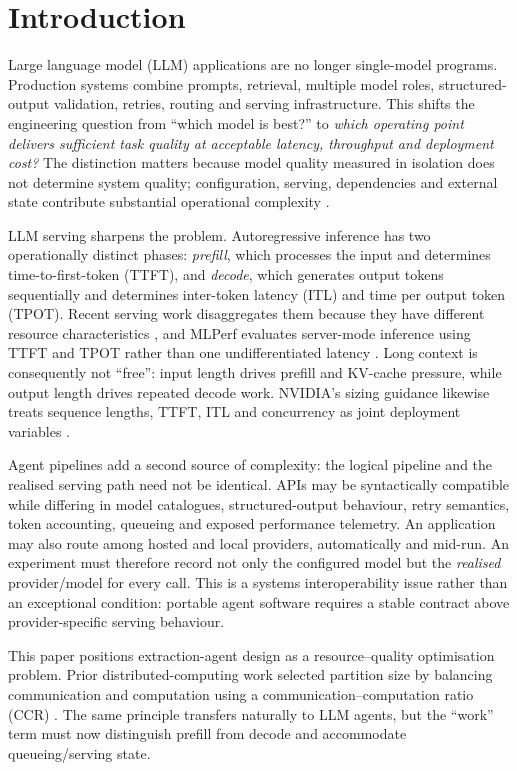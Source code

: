 \documentclass[conference]{IEEEtran}
\begin{document}
\section{Introduction}
Large language model (LLM) applications are no longer single-model programs. Production systems combine prompts, retrieval, multiple model roles, structured-output validation, retries, routing and serving infrastructure. This shifts the engineering question from ``which model is best?'' to \emph{which operating point delivers sufficient task quality at acceptable latency, throughput and deployment cost?} The distinction matters because model quality measured in isolation does not determine system quality; configuration, serving, dependencies and external state contribute substantial operational complexity \cite{sculley2015debt}.

LLM serving sharpens the problem. Autoregressive inference has two operationally distinct phases: \emph{prefill}, which processes the input and determines time-to-first-token (TTFT), and \emph{decode}, which generates output tokens sequentially and determines inter-token latency (ITL) and time per output token (TPOT). Recent serving work disaggregates them because they have different resource characteristics \cite{zhong2024distserve}, and MLPerf evaluates server-mode inference using TTFT and TPOT rather than one undifferentiated latency \cite{mlperf2025llm}. Long context is consequently not ``free'': input length drives prefill and KV-cache pressure, while output length drives repeated decode work. NVIDIA's sizing guidance likewise treats sequence lengths, TTFT, ITL and concurrency as joint deployment variables \cite{nvidiaRAGSizing,nvidiaDynamoProfiler}.

Agent pipelines add a second source of complexity: the logical pipeline and the realised serving path need not be identical. APIs may be syntactically compatible while differing in model catalogues, structured-output behaviour, retry semantics, token accounting, queueing and exposed performance telemetry. An application may also route among hosted and local providers, automatically and mid-run. An experiment must therefore record not only the configured model but the \emph{realised} provider/model for every call. This is a systems interoperability issue rather than an exceptional condition: portable agent software requires a stable contract above provider-specific serving behaviour.

This paper positions extraction-agent design as a resource--quality optimisation problem. Prior distributed-computing work selected partition size by balancing communication and computation using a communication--computation ratio (CCR) \cite{helal2008parallel,helal2009search,helal2009thesis}. The same principle transfers naturally to LLM agents, but the ``work'' term must now distinguish prefill from decode and accommodate queueing/serving state.
\end{document}
